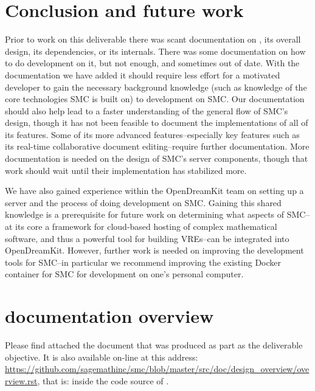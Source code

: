 \documentclass{deliverablereport}
\begin{document}
\section{Conclusion and future work}
Prior to work on this deliverable there was scant documentation on \SMC, its
overall design, its dependencies, or its internals.  There was some
documentation on how to do development on it, but not enough, and sometimes
out of date.  With the documentation we have added it should require less
effort for a motivated developer to gain the necessary background knowledge
(such as knowledge of the core technologies SMC is built on) to development on
SMC.  Our documentation should also help lead to a faster understanding of
the general flow of SMC's design, though it has not been feasible to document
the implementations of all of its features.  Some of its more advanced
features--especially key features such as its real-time collaborative document
editing--require further documentation.  More documentation is needed on the
design of SMC's server components, though that work should wait until their
implementation has stabilized more.

We have also gained experience within the OpenDreamKit team on setting up a
\SMC server and the process of doing development on SMC.  Gaining this shared
knowledge is a prerequisite for future work on determining what aspects of
SMC--at its core a framework for cloud-based hosting of complex mathematical
software, and thus a powerful tool for building VREs--can be integrated into
OpenDreamKit.  However, further work is needed on improving the development
tools for SMC--in particular we recommend improving the existing Docker
container for SMC for development on one's personal computer.


\printbibliography

\appendix
\section{\SMC documentation overview}
\label{app:doc}

Please find attached the document that was produced as part as the deliverable objective.
It is also available on-line at this address: \url{https://github.com/sagemathinc/smc/blob/master/src/doc/design_overview/overview.rst}, that is: inside the code source of \SMC.


\end{document}
